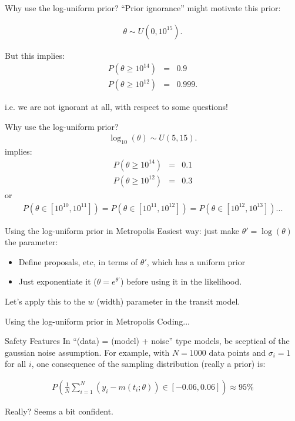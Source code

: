 \begin{frame}[t]{Why use the log-uniform prior?}
``Prior ignorance'' might motivate this prior:

\begin{eqnarray*}
\theta \sim U(0, 10^{15}).
\end{eqnarray*}

But this implies:
\begin{eqnarray*}
P(\theta \geq 10^{14}) &=& 0.9\\
P(\theta \geq 10^{12}) &=& 0.999.
\end{eqnarray*}

i.e. we are not ignorant at all, with respect to some questions!

\end{frame}

\begin{frame}[t]{Why use the log-uniform prior?}
\begin{eqnarray*}
\log_{10}(\theta) \sim U(5, 15).
\end{eqnarray*}
implies:
\begin{eqnarray*}
P(\theta \geq 10^{14}) &=& 0.1\\
P(\theta \geq 10^{12}) &=& 0.3
\end{eqnarray*}
or
\begin{eqnarray*}
P(\theta \in [10^{10}, 10^{11}]) = P(\theta \in [10^{11}, 10^{12}])
= P(\theta \in [10^{12}, 10^{13}]) ...
\end{eqnarray*}
\end{frame}

\begin{frame}[t]{Using the log-uniform prior in Metropolis}
Easiest way: just make $\theta' = \log(\theta)$ the parameter:

\begin{itemize}
\item Define proposals, etc, in terms of $\theta'$, which has a uniform prior
\item Just exponentiate it ($\theta = e^{\theta'}$) before using it in the likelihood.
\end{itemize}

Let's apply this to the $w$ (width) parameter in the transit model.
\end{frame}

\begin{frame}[t]{Using the log-uniform prior in Metropolis}
Coding...
\end{frame}

\begin{frame}[t]{Safety Features}
In ``(data) = (model) + noise'' type models, be sceptical of the gaussian
noise assumption. For example, with $N=1000$ data points and $\sigma_i=1$ for
all $i$, one consequence of the sampling distribution (really a prior) is:

\begin{eqnarray}
P\left(\frac{1}{N}\sum_{i=1}^N (y_i - m(t_i; \theta)) \in [-0.06, 0.06]\right)
\approx 95\% 
\end{eqnarray}

Really? Seems a bit confident.
\end{frame}

